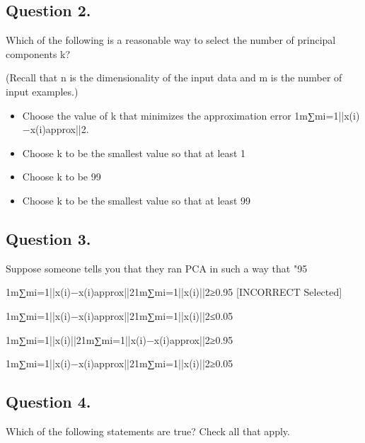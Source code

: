 
\subsection{ Question 2. }
Which of the following is a reasonable way to select the number of principal components k?

(Recall that n is the dimensionality of the input data and m is the number of input examples.)

\begin{itemize}
\item Choose the value of k that minimizes the approximation error 1m∑mi=1||x(i)−x(i)approx||2.

\item Choose k to be the smallest value so that at least 1%

\item Choose k to be 99%

\item Choose k to be the smallest value so that at least 99%

\end{itemize}
\subsection{ Question 3. }
Suppose someone tells you that they ran PCA in such a way that "95%

1m∑mi=1||x(i)−x(i)approx||21m∑mi=1||x(i)||2≥0.95 [INCORRECT Selected]

1m∑mi=1||x(i)−x(i)approx||21m∑mi=1||x(i)||2≤0.05

1m∑mi=1||x(i)||21m∑mi=1||x(i)−x(i)approx||2≥0.95

1m∑mi=1||x(i)−x(i)approx||21m∑mi=1||x(i)||2≥0.05

\subsection{ Question 4. }
Which of the following statements are true? Check all that apply.


